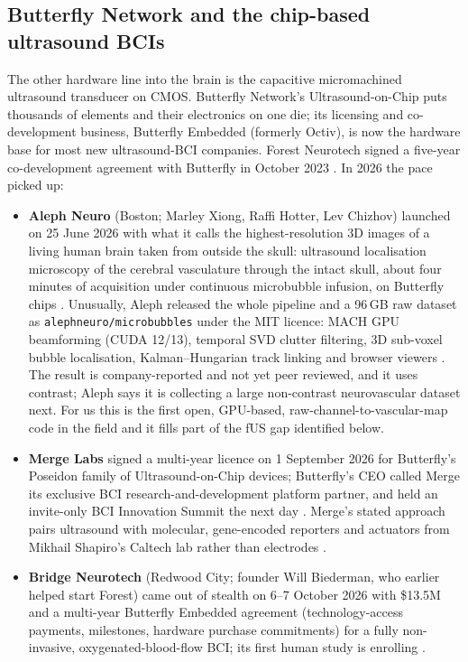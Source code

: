 \documentclass[11pt,a4paper]{article}
\begin{document}
\subsection{Butterfly Network and the chip-based ultrasound BCIs}\label{sec:butterfly}

The other hardware line into the brain is the capacitive micromachined ultrasound transducer on CMOS. Butterfly Network's Ultrasound-on-Chip puts thousands of elements and their electronics on one die; its licensing and co-development business, Butterfly Embedded (formerly Octiv), is now the hardware base for most new ultrasound-BCI companies. Forest Neurotech signed a five-year co-development agreement with Butterfly in October 2023 \cite{bfly_forest}. In 2026 the pace picked up:

\begin{itemize}[leftmargin=*,nosep]
\item \textbf{Aleph Neuro} (Boston; Marley Xiong, Raffi Hotter, Lev Chizhov) launched on 25 June 2026 with what it calls the highest-resolution 3D images of a living human brain taken from outside the skull: ultrasound localisation microscopy of the cerebral vasculature through the intact skull, about four minutes of acquisition under continuous microbubble infusion, on Butterfly chips \cite{bfly_aleph,aleph}. Unusually, Aleph released the whole pipeline and a 96\,GB raw dataset as \texttt{alephneuro/microbubbles} under the MIT licence: MACH GPU beamforming (CUDA 12/13), temporal SVD clutter filtering, 3D sub-voxel bubble localisation, Kalman--Hungarian track linking and browser viewers \cite{aleph_repo}. The result is company-reported and not yet peer reviewed, and it uses contrast; Aleph says it is collecting a large non-contrast neurovascular dataset next. For us this is the first open, GPU-based, raw-channel-to-vascular-map code in the field and it fills part of the fUS gap identified below.
\item \textbf{Merge Labs} signed a multi-year licence on 1 September 2026 for Butterfly's Poseidon family of Ultrasound-on-Chip devices; Butterfly's CEO called Merge its exclusive BCI research-and-development platform partner, and held an invite-only BCI Innovation Summit the next day \cite{bfly_merge}. Merge's stated approach pairs ultrasound with molecular, gene-encoded reporters and actuators from Mikhail Shapiro's Caltech lab rather than electrodes \cite{merge}.
\item \textbf{Bridge Neurotech} (Redwood City; founder Will Biederman, who earlier helped start Forest) came out of stealth on 6--7 October 2026 with \$13.5M and a multi-year Butterfly Embedded agreement (technology-access payments, milestones, hardware purchase commitments) for a fully non-invasive, oxygenated-blood-flow BCI; its first human study is enrolling \cite{bfly_bridge}.

\end{itemize}
\end{document}
